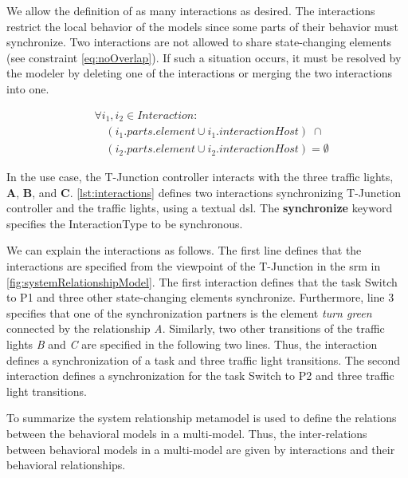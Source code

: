 \documentclass{jot}
\begin{document}
We allow the definition of as many interactions as desired.
The interactions restrict the local behavior of the models since some parts of their behavior must synchronize.
Two interactions are not allowed to share state-changing elements (see constraint \eqref{eq:noOverlap}).
If such a situation occurs, it must be resolved by the modeler by deleting one of the interactions or merging the two interactions into one.

\begin{equation} \label{eq:noOverlap}
    \begin{aligned}
    & \forall i_1,i_2 \in Interaction : \\
    & \quad (i_1.parts.element \cup i_1.interactionHost) \; \cap \\
    & \quad (i_2.parts.element \cup i_2.interactionHost) = \emptyset
    \end{aligned}
\end{equation}

In the use case, the T-Junction controller interacts with the three traffic lights, \textbf{A}, \textbf{B}, and \textbf{C}.
\autoref{lst:interactions} defines two interactions synchronizing T-Junction controller and the traffic lights, using a textual \gls*{dsl}.
The \textbf{synchronize} keyword specifies the \textsf{InteractionType} to be \textsf{synchronous}.



We can explain the interactions as follows.
The first line defines that the interactions are specified from the viewpoint of the T-Junction in the \gls*{srm} in \cref{fig:systemRelationshipModel}.
The first interaction defines that the task \textsf{Switch to P1} and three other state-changing elements synchronize.
Furthermore, line 3 specifies that one of the synchronization partners is the element \textit{turn green} connected by the relationship \textit{A}.
Similarly, two other transitions of the traffic lights \textit{B} and \textit{C} are specified in the following two lines.
Thus, the interaction defines a synchronization of a task and three traffic light transitions. 
The second interaction defines a synchronization for the task \textsf{Switch to P2} and three traffic light transitions.

To summarize the system relationship metamodel is used to define the relations between the behavioral models in a multi-model.
Thus, the inter-relations between behavioral models in a multi-model are given by interactions and their behavioral relationships.
\end{document}
